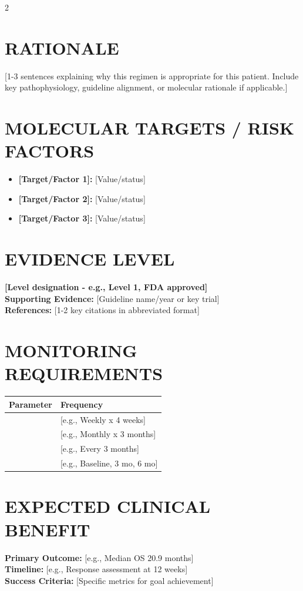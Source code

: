 \documentclass[10pt,letterpaper]{article}
\begin{document}
\begin{multicols}{2}
\section*{RATIONALE}
{\small
[1-3 sentences explaining why this regimen is appropriate for this patient. Include key pathophysiology, guideline alignment, or molecular rationale if applicable.]
}

\columnbreak


\section*{MOLECULAR TARGETS / RISK FACTORS}
{\small
\begin{itemize}
    \item \textbf{[Target/Factor 1]:} [Value/status]
    \item \textbf{[Target/Factor 2]:} [Value/status]
    \item \textbf{[Target/Factor 3]:} [Value/status]
\end{itemize}
}

\section*{EVIDENCE LEVEL}
{\small
\textbf{[Level designation - e.g., Level 1, FDA approved]}\\
\textbf{Supporting Evidence:} [Guideline name/year or key trial]\\
\textbf{References:} [1-2 key citations in abbreviated format]
}

\section*{MONITORING REQUIREMENTS}
{\small
\begin{tabular}{@{}ll@{}}
\textbf{Parameter} & \textbf{Frequency} \\
\hline
[Lab/vital 1] & [e.g., Weekly x 4 weeks] \\
[Lab/vital 2] & [e.g., Monthly x 3 months] \\
[Lab/vital 3] & [e.g., Every 3 months] \\
[Assessment tool] & [e.g., Baseline, 3 mo, 6 mo] \\
\end{tabular}
}

\section*{EXPECTED CLINICAL BENEFIT}
{\small
\textbf{Primary Outcome:} [e.g., Median OS 20.9 months]\\
\textbf{Timeline:} [e.g., Response assessment at 12 weeks]\\
\textbf{Success Criteria:} [Specific metrics for goal achievement]
}


\end{multicols}
\end{document}

